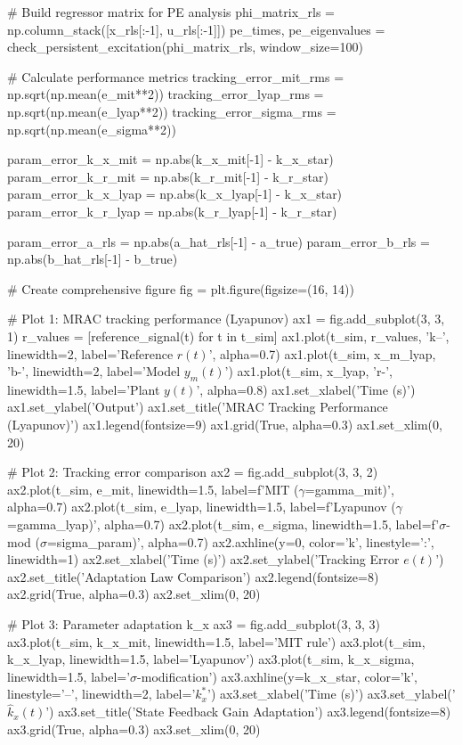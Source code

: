 \documentclass[a4paper, 11pt]{article}
\begin{document}
\begin{pycode}
# Build regressor matrix for PE analysis
phi_matrix_rls = np.column_stack([x_rls[:-1], u_rls[:-1]])
pe_times, pe_eigenvalues = check_persistent_excitation(phi_matrix_rls, window_size=100)

# Calculate performance metrics
tracking_error_mit_rms = np.sqrt(np.mean(e_mit**2))
tracking_error_lyap_rms = np.sqrt(np.mean(e_lyap**2))
tracking_error_sigma_rms = np.sqrt(np.mean(e_sigma**2))

param_error_k_x_mit = np.abs(k_x_mit[-1] - k_x_star)
param_error_k_r_mit = np.abs(k_r_mit[-1] - k_r_star)
param_error_k_x_lyap = np.abs(k_x_lyap[-1] - k_x_star)
param_error_k_r_lyap = np.abs(k_r_lyap[-1] - k_r_star)

param_error_a_rls = np.abs(a_hat_rls[-1] - a_true)
param_error_b_rls = np.abs(b_hat_rls[-1] - b_true)

# Create comprehensive figure
fig = plt.figure(figsize=(16, 14))

# Plot 1: MRAC tracking performance (Lyapunov)
ax1 = fig.add_subplot(3, 3, 1)
r_values = [reference_signal(t) for t in t_sim]
ax1.plot(t_sim, r_values, 'k--', linewidth=2, label='Reference $r(t)$', alpha=0.7)
ax1.plot(t_sim, x_m_lyap, 'b-', linewidth=2, label='Model $y_m(t)$')
ax1.plot(t_sim, x_lyap, 'r-', linewidth=1.5, label='Plant $y(t)$', alpha=0.8)
ax1.set_xlabel('Time (s)')
ax1.set_ylabel('Output')
ax1.set_title('MRAC Tracking Performance (Lyapunov)')
ax1.legend(fontsize=9)
ax1.grid(True, alpha=0.3)
ax1.set_xlim(0, 20)

# Plot 2: Tracking error comparison
ax2 = fig.add_subplot(3, 3, 2)
ax2.plot(t_sim, e_mit, linewidth=1.5, label=f'MIT ($\gamma$={gamma_mit})', alpha=0.7)
ax2.plot(t_sim, e_lyap, linewidth=1.5, label=f'Lyapunov ($\gamma$={gamma_lyap})', alpha=0.7)
ax2.plot(t_sim, e_sigma, linewidth=1.5, label=f'$\sigma$-mod ($\sigma$={sigma_param})', alpha=0.7)
ax2.axhline(y=0, color='k', linestyle=':', linewidth=1)
ax2.set_xlabel('Time (s)')
ax2.set_ylabel('Tracking Error $e(t)$')
ax2.set_title('Adaptation Law Comparison')
ax2.legend(fontsize=8)
ax2.grid(True, alpha=0.3)
ax2.set_xlim(0, 20)

# Plot 3: Parameter adaptation k_x
ax3 = fig.add_subplot(3, 3, 3)
ax3.plot(t_sim, k_x_mit, linewidth=1.5, label='MIT rule')
ax3.plot(t_sim, k_x_lyap, linewidth=1.5, label='Lyapunov')
ax3.plot(t_sim, k_x_sigma, linewidth=1.5, label='$\sigma$-modification')
ax3.axhline(y=k_x_star, color='k', linestyle='--', linewidth=2, label='$k_x^*$')
ax3.set_xlabel('Time (s)')
ax3.set_ylabel('$\hat{k}_x(t)$')
ax3.set_title('State Feedback Gain Adaptation')
ax3.legend(fontsize=8)
ax3.grid(True, alpha=0.3)
ax3.set_xlim(0, 20)


\end{pycode}
\end{document}
